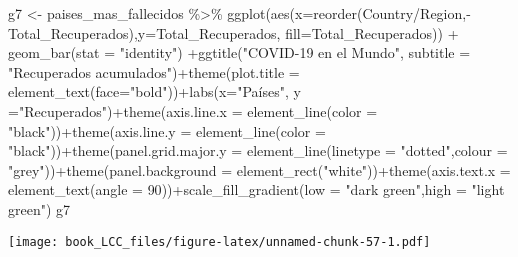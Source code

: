 \documentclass[
]{book}
\newenvironment{Shaded}{\begin{snugshade}}{\end{snugshade}}
\newcommand{\AttributeTok}[1]{\textcolor[rgb]{0.77,0.63,0.00}{#1}}
\newcommand{\DecValTok}[1]{\textcolor[rgb]{0.00,0.00,0.81}{#1}}
\newcommand{\FunctionTok}[1]{\textcolor[rgb]{0.00,0.00,0.00}{#1}}
\newcommand{\NormalTok}[1]{#1}
\newcommand{\OtherTok}[1]{\textcolor[rgb]{0.56,0.35,0.01}{#1}}
\newcommand{\SpecialCharTok}[1]{\textcolor[rgb]{0.00,0.00,0.00}{#1}}
\newcommand{\StringTok}[1]{\textcolor[rgb]{0.31,0.60,0.02}{#1}}
\begin{document}
\begin{Shaded}
\begin{Highlighting}[]
\NormalTok{g7 }\OtherTok{\textless{}{-}}\NormalTok{ paises\_mas\_fallecidos }\SpecialCharTok{\%\textgreater{}\%}
    \FunctionTok{ggplot}\NormalTok{(}\FunctionTok{aes}\NormalTok{(}\AttributeTok{x=}\FunctionTok{reorder}\NormalTok{(}\StringTok{\textasciigrave{}}\AttributeTok{Country/Region}\StringTok{\textasciigrave{}}\NormalTok{,}\SpecialCharTok{{-}}\NormalTok{Total\_Recuperados),}\AttributeTok{y=}\NormalTok{Total\_Recuperados, }\AttributeTok{fill=}\NormalTok{Total\_Recuperados)) }\SpecialCharTok{+}  \FunctionTok{geom\_bar}\NormalTok{(}\AttributeTok{stat =} \StringTok{"identity"}\NormalTok{) }\SpecialCharTok{+}\FunctionTok{ggtitle}\NormalTok{(}\StringTok{"COVID{-}19 en el Mundo"}\NormalTok{, }\AttributeTok{subtitle =} \StringTok{"Recuperados acumulados"}\NormalTok{)}\SpecialCharTok{+}\FunctionTok{theme}\NormalTok{(}\AttributeTok{plot.title =} \FunctionTok{element\_text}\NormalTok{(}\AttributeTok{face=}\StringTok{"bold"}\NormalTok{))}\SpecialCharTok{+}\FunctionTok{labs}\NormalTok{(}\AttributeTok{x=}\StringTok{"Países"}\NormalTok{, }\AttributeTok{y =}\StringTok{"Recuperados"}\NormalTok{)}\SpecialCharTok{+}\FunctionTok{theme}\NormalTok{(}\AttributeTok{axis.line.x =} \FunctionTok{element\_line}\NormalTok{(}\AttributeTok{color =} \StringTok{"black"}\NormalTok{))}\SpecialCharTok{+}\FunctionTok{theme}\NormalTok{(}\AttributeTok{axis.line.y =} \FunctionTok{element\_line}\NormalTok{(}\AttributeTok{color =} \StringTok{"black"}\NormalTok{))}\SpecialCharTok{+}\FunctionTok{theme}\NormalTok{(}\AttributeTok{panel.grid.major.y =} \FunctionTok{element\_line}\NormalTok{(}\AttributeTok{linetype =} \StringTok{"dotted"}\NormalTok{,}\AttributeTok{colour =} \StringTok{"grey"}\NormalTok{))}\SpecialCharTok{+}\FunctionTok{theme}\NormalTok{(}\AttributeTok{panel.background =} \FunctionTok{element\_rect}\NormalTok{(}\StringTok{"white"}\NormalTok{))}\SpecialCharTok{+}\FunctionTok{theme}\NormalTok{(}\AttributeTok{axis.text.x =} \FunctionTok{element\_text}\NormalTok{(}\AttributeTok{angle =} \DecValTok{90}\NormalTok{))}\SpecialCharTok{+}\FunctionTok{scale\_fill\_gradient}\NormalTok{(}\AttributeTok{low =} \StringTok{"dark green"}\NormalTok{,}\AttributeTok{high =} \StringTok{"light green"}\NormalTok{)}
\NormalTok{g7}
\end{Highlighting}
\end{Shaded}

\texttt{[image: book\_LCC\_files/figure-latex/unnamed-chunk-57-1.pdf]}
\end{document}

